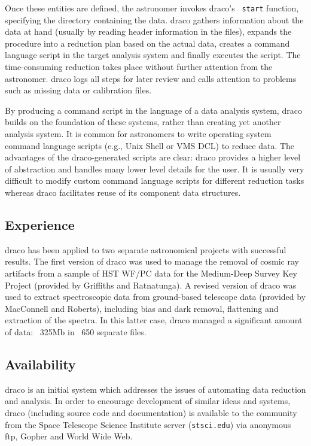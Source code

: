 Once these entities are defined, the astronomer invokes {\sc draco}'s {\tt 
start} function, specifying the directory containing the data. {\sc draco} 
gathers information about the data at hand (usually by reading header 
information in the files), expands the procedure into a reduction plan 
based on the actual data, creates a command language script in the target 
analysis system and finally executes the script. The time-consuming 
reduction takes place without further attention from the astronomer. {\sc 
draco} logs all steps for later review and calls attention to problems 
such as missing data or calibration files.

By producing a command script in the language of a data analysis system, 
{\sc draco} builds on the foundation of these systems, rather than creating 
yet another analysis system. It is common for astronomers to write 
operating system command language scripts (e.g., Unix Shell or VMS DCL) to 
reduce data. The advantages of the {\sc draco}-generated scripts are clear: 
{\sc draco} provides a higher level of abstraction and handles many lower 
level details for the user. It is usually very difficult to modify custom 
command language scripts for different reduction tasks whereas {\sc draco} 
facilitates reuse of its component data structures. 

\subsection{Experience}

{\sc draco} has been applied to two separate astronomical projects with 
successful results. The first version of {\sc draco} was used to manage the 
removal of cosmic ray artifacts from a sample of HST WF/PC data for the 
Medium-Deep Survey Key Project (provided by Griffiths and Ratnatunga). A 
revised version of {\sc draco} was used to extract spectroscopic data from 
ground-based telescope data (provided by MacConnell and Roberts), including 
bias and dark removal, flattening and extraction of the spectra. In this 
latter case, {\sc draco} managed a significant amount of data: ~325Mb in 
~650 separate files. 

\subsection{Availability}

{\sc draco} is an initial system which addresses the issues of automating 
data reduction and analysis. In order to encourage development of similar 
ideas and systems, {\sc draco} (including source code and documentation) is 
available to the community from the Space Telescope Science Institute 
server ({\tt stsci.edu}) via anonymous ftp, Gopher and World Wide Web. 


